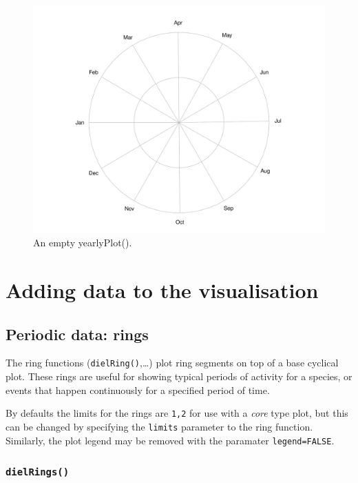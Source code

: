 \documentclass[
]{book}
\begin{document}
\begin{figure}

{\centering \includegraphics[width=0.9\linewidth]{_main_files/figure-latex/emptyYearly-1} 

}

\caption{An empty yearlyPlot().}\label{fig:emptyYearly}
\end{figure}

\hypertarget{adding-to-cyclical}{%
\section{Adding data to the visualisation}\label{adding-to-cyclical}}

\hypertarget{periodic-data-rings}{%
\subsection{Periodic data: rings}\label{periodic-data-rings}}

The ring functions (\texttt{dielRing()},\ldots) plot ring segments on top of a base cyclical plot. These rings are useful for showing typical periods of activity for a species, or events that happen continuously for a specified period of time.

By defaults the limits for the rings are \texttt{1,2} for use with a \emph{core} type plot, but this can be changed by specifying the \texttt{limits} parameter to the ring function. Similarly, the plot legend may be removed with the paramater \texttt{legend=FALSE}.

\hypertarget{dielrings}{%
\subsubsection{\texorpdfstring{\texttt{dielRings()}}{dielRings()}}\label{dielrings}}
\end{document}
